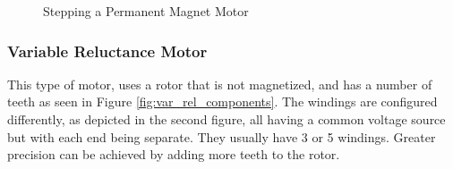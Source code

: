\begin{figure}[htp]
    \begin{center}
    \hfill
    \hfill
  	\hfill
  	\caption{Stepping a Permanent Magnet Motor}
  	\label{fig:stepping_perm_magn}
    \end{center}
\end{figure}

\subsubsection{Variable Reluctance Motor}
This type of motor, uses a rotor that is not magnetized, and has a number of teeth as seen in Figure \ref{fig:var_rel_components}. The windings are configured differently, as depicted in the second figure, all having a common voltage source but with each end being separate. They usually have 3 or 5 windings. Greater precision can be achieved by adding more teeth to the rotor.

